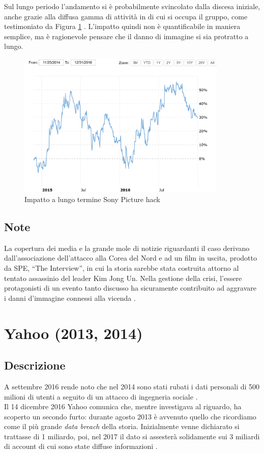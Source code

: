 \documentclass[12pt,a4paper,twoside]{report}
\begin{document}
Sul lungo periodo l'andamento si \`e probabilmente svincolato dalla discesa iniziale, anche  grazie alla diffusa gamma di attivit\`a in di cui si occupa il gruppo, come testimoniato da Figura \ref{fig:sPic2} \cite{macrotrends_sony}. L'impatto quindi non \`e quantificabile in maniera semplice, ma \`e ragionevole pensare che il danno di immagine si sia protratto a lungo.\\
\begin{figure}[H] 
\begin{center} 
\includegraphics[width=10cm]{figures/sony_2014_long.png} 
\caption[Grafico Sony Pic long]{Impatto a lungo termine Sony Picture hack}\label{fig:sPic2}
\end{center}
\end{figure}
\subsection{Note}
La copertura dei media e la grande mole di notizie riguardanti il caso derivano dall'associazione dell'attacco alla Corea del Nord e ad un film in uscita, prodotto da SPE, ``The Interview'', in cui la storia sarebbe stata costruita attorno al tentato assassinio del leader Kim Jong Un.
Nella gestione della crisi, l'essere protagonisti di un evento tanto discusso ha sicuramente contribuito ad aggravare i danni d'immagine connessi alla vicenda \cite{SonyPic_buzzfeed}.\\

\section{Yahoo (2013, 2014)}
\subsection{Descrizione}
A settembre 2016 rende noto che nel 2014 sono stati rubati i dati personali di 500 milioni di utenti a seguito di un attacco di ingegneria sociale \cite{yahoo_book}.\\
Il 14 dicembre 2016 Yahoo comunica che, mentre investigava al riguardo, ha scoperto un secondo furto: durante agosto 2013 \`e avvenuto quello che ricordiamo come il pi\`u grande \textit{data breach} della storia. Inizialmente venne dichiarato si trattasse di 1 miliardo, poi, nel 2017 il dato si assester\`a solidamente sui 3 miliardi di account di cui sono state diffuse informazioni \cite{yahoo_book}\cite{yahoo_guardian}.
\end{document}
